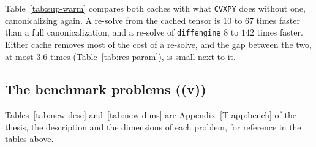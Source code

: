 \documentclass[letterpaper,12pt]{article}
\begin{document}
Table~\ref{tab:sup-warm} compares both caches with what \texttt{CVXPY} does without one,
canonicalizing again. A re-solve from the cached tensor is $10$ to $67$ times faster than a full
canonicalization, and a re-solve of \texttt{diffengine} $8$ to $142$ times faster. Either cache
removes most of the cost of a re-solve, and the gap between the two, at most $3.6$ times
(Table~\ref{tab:res-param}), is small next to it.

\subsection{The benchmark problems ((v))}

Tables~\ref{tab:new-desc} and~\ref{tab:new-dims} are Appendix~\ref{T-app:bench} of the thesis,
the description and the dimensions of each problem, for reference in the tables above.
\end{document}
